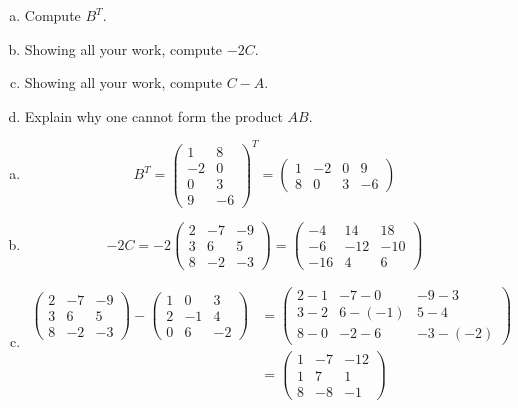 \documentclass[12pt,letterpaper]{exam}
\begin{document}
\begin{questions}
\begin{enumerate}[(a)]
\item Compute $B^T$. 
\item Showing all your work, compute $-2C$.
\item Showing all your work, compute $C - A$. 
\item Explain why one cannot form the product $AB$. 
\end{enumerate} \pspace

\sol 
\begin{enumerate}[(a)]
\item 
	\[
	B^T= \begin{pmatrix} 1 & 8 \\ -2 & 0 \\ 0 & 3 \\ 9 & -6 \end{pmatrix}^T= \begin{pmatrix} 1 & -2 & 0 & 9 \\ 8 & 0 & 3 & -6 \end{pmatrix}
	\] \pspace

\item 
	\[
	-2C= -2 \begin{pmatrix} 2 & -7 & -9 \\ 3 & 6 & 5 \\ 8 & -2 & -3 \end{pmatrix}= \begin{pmatrix} -4 & 14 & 18 \\ -6 & -12 & -10 \\ -16 & 4 & 6 \end{pmatrix}
	\] \pspace

\item 
	\[
	\begin{aligned}
	\begin{pmatrix} 2 & -7 & -9 \\ 3 & 6 & 5 \\ 8 & -2 & -3 \end{pmatrix} - \begin{pmatrix} 1 & 0 & 3 \\ 2 & -1 & 4 \\ 0 & 6 & -2 \end{pmatrix}&= \begin{pmatrix} 2 - 1 & -7 - 0 & -9 - 3 \\ 3 - 2 & 6 - (-1) & 5 - 4 \\ 8 - 0 & -2 - 6 & -3 - (-2) \end{pmatrix} \\
	&= \begin{pmatrix} 1 & -7 & -12 \\ 1 & 7 & 1 \\ 8 & -8 & -1 \end{pmatrix}
	\end{aligned}
	\] \pspace


\end{enumerate}
\end{questions}
\end{document}
